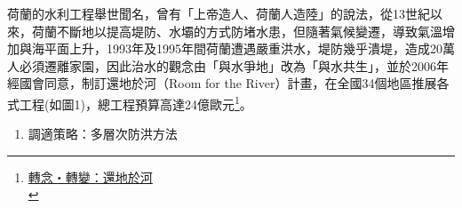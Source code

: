 \documentclass[a4paper,12pt]{article}
\begin{document}
\begin{enumerate}
荷蘭的水利工程舉世聞名，曾有「上帝造人、荷蘭人造陸」的說法，從13世紀以來，荷蘭不斷地以提高堤防、水壩的方式防堵水患，但隨著氣候變遷，導致氣溫增加與海平面上升，1993年及1995年間荷蘭遭遇嚴重洪水，堤防幾乎潰堤，造成20萬人必須遷離家園，因此治水的觀念由「與水爭地」改為「與水共生」，並於2006年經國會同意，制訂還地於河（Room for the River）計畫，在全國34個地區推展各式工程(如圖1)，總工程預算高達24億歐元\footnote{\href{https://epaper.land.gov.taipei/Item/Detail/\%E6\%89\%93\%E9\%80\%A0\%E9\%9F\%8C\%E6\%80\%A7\%E5\%9F\%8E\%E5\%B8\%82\%E2\%80\%94\%E8\%8D\%B7\%E8\%98\%AD\%E5\%A5\%88\%E6\%A2\%85\%E4\%BA\%A8\%E9\%82\%84\%E5\%9C\%B0\%E6\%96\%BC\%E6\%B2\%B3\%E8\%A8\%88\%E7\%95\%AB}{轉念・轉變：還地於河 }\\\label{orgc0b47f9}}。\\

\begin{enumerate}
\item 調適策略：多層次防洪方法
\label{sec:orgf5119c1}


\end{enumerate}
\end{enumerate}
\end{document}
